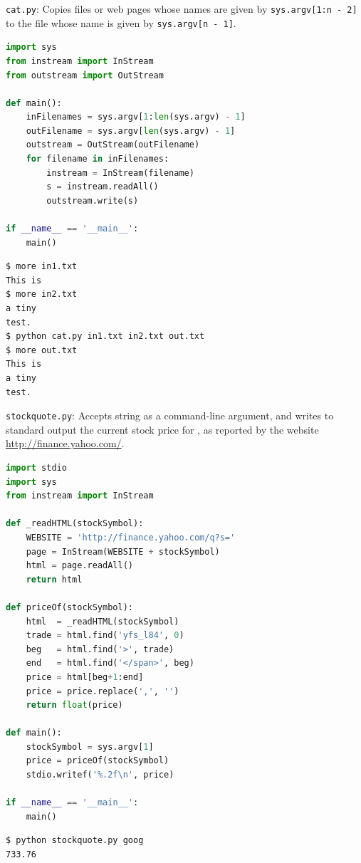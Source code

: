 \documentclass[8pt,a4paper,compress,handout]{beamer}
\begin{document}
\begin{frame}[fragile]
\begin{framed}
\tiny \lstinline{cat.py}: Copies files or web pages whose names are given by \lstinline{sys.argv[1:n - 2]} to the file whose name is given by \lstinline{sys.argv[n - 1]}.
\end{framed}

\begin{lstlisting}[language=Python]
import sys
from instream import InStream
from outstream import OutStream

def main():
    inFilenames = sys.argv[1:len(sys.argv) - 1]
    outFilename = sys.argv[len(sys.argv) - 1]
    outstream = OutStream(outFilename)
    for filename in inFilenames:
        instream = InStream(filename)
        s = instream.readAll()
        outstream.write(s)

if __name__ == '__main__':
    main()
\end{lstlisting}

\begin{lstlisting}[language={}]
$ more in1.txt
This is
$ more in2.txt
a tiny
test.
$ python cat.py in1.txt in2.txt out.txt
$ more out.txt
This is
a tiny
test.
\end{lstlisting}
\end{frame}

\begin{frame}[fragile]
\begin{framed}
\tiny \lstinline{stockquote.py}: Accepts string  as a command-line argument, and writes to standard output the current stock price for , as reported by the website \href{http://finance.yahoo.com/}{http://finance.yahoo.com/}.
\end{framed}

\begin{lstlisting}[language=Python]
import stdio
import sys
from instream import InStream

def _readHTML(stockSymbol):
    WEBSITE = 'http://finance.yahoo.com/q?s='
    page = InStream(WEBSITE + stockSymbol)
    html = page.readAll()
    return html

def priceOf(stockSymbol):
    html  = _readHTML(stockSymbol)
    trade = html.find('yfs_l84', 0)
    beg   = html.find('>', trade)
    end   = html.find('</span>', beg)
    price = html[beg+1:end]
    price = price.replace(',', '')
    return float(price)

def main():
    stockSymbol = sys.argv[1]
    price = priceOf(stockSymbol)
    stdio.writef('%.2f\n', price)

if __name__ == '__main__':
    main()
\end{lstlisting}

\begin{lstlisting}[language={}]
$ python stockquote.py goog
733.76
\end{lstlisting}
\end{frame}
\end{document}
